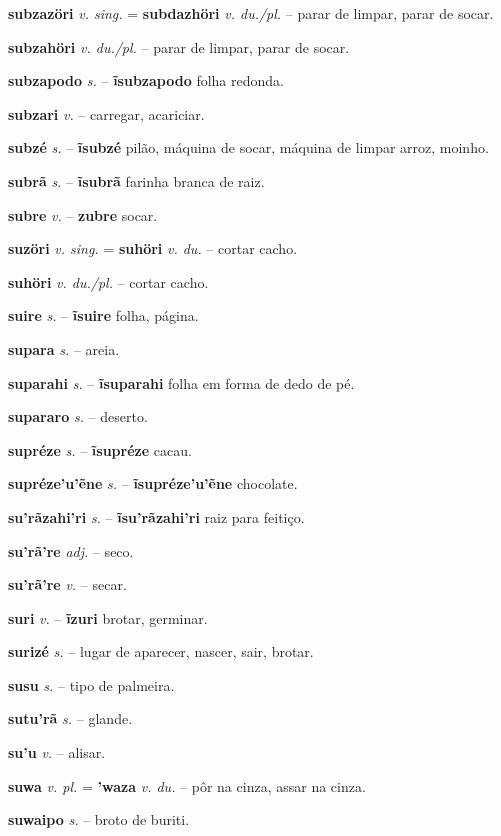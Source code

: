 \textbf{subzazöri} \textit{v. sing.} = \textbf{subdazhöri} \textit{v. du./pl.} -- parar de limpar, parar de socar.

\textbf{subzahöri} \textit{v. du./pl.} -- parar de limpar, parar de socar.

\textbf{subzapodo} \textit{s.} -- \textbf{ĩsubzapodo} folha redonda.

\textbf{subzari} \textit{v.} -- carregar, acariciar.

\textbf{subzé} \textit{s.} -- \textbf{ĩsubzé} pilão, máquina de socar, máquina de limpar arroz, moinho.

\textbf{subrã} \textit{s.} -- \textbf{ĩsubrã} farinha branca de raiz.

\textbf{subre} \textit{v.} -- \textbf{zubre} socar.

\textbf{suzöri} \textit{v. sing.} = \textbf{suhöri} \textit{v. du.} -- cortar cacho.

\textbf{suhöri} \textit{v. du./pl.} -- cortar cacho.

\textbf{suire} \textit{s.} -- \textbf{ĩsuire} folha, página.

\textbf{supara} \textit{s.} -- areia.

\textbf{suparahi} \textit{s.} -- \textbf{ĩsuparahi} folha em forma de dedo de pé.

\textbf{supararo} \textit{s.} -- deserto.

\textbf{supréze} \textit{s.} -- \textbf{ĩsupréze} cacau.

\textbf{supréze'u'ẽne} \textit{s.} -- \textbf{ĩsupréze'u'ẽne} chocolate.

\textbf{su'rãzahi'ri} \textit{s.} -- \textbf{ĩsu'rãzahi'ri} raiz para feitiço.

\textbf{su'rã're} \textit{adj.} -- seco.

\textbf{su'rã're} \textit{v.} -- secar.

\textbf{suri} \textit{v.} -- \textbf{ĩzuri} brotar, germinar.

\textbf{surizé} \textit{s.} -- lugar de aparecer, nascer, sair, brotar.

\textbf{susu} \textit{s.} -- tipo de palmeira.

\textbf{sutu'rã} \textit{s.} -- glande.

\textbf{su'u} \textit{v.} -- alisar.

\textbf{suwa} \textit{v. pl.} = \textbf{'waza} \textit{v. du.} -- pôr na cinza, assar na cinza.

\textbf{suwaipo} \textit{s.} -- broto de buriti.

